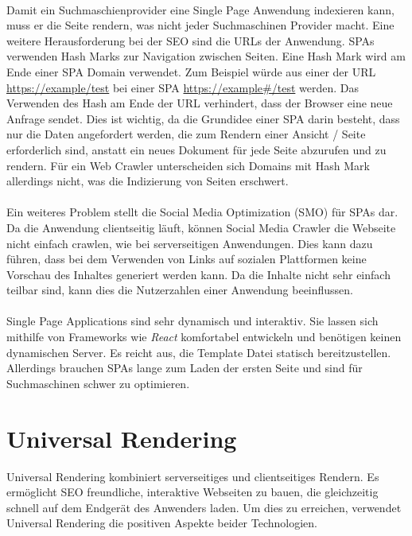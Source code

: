 \documentclass[runningheads]{llncs}
\numberwithin{figure}{section}
\begin{document}
\\
Damit ein Suchmaschienprovider eine Single Page Anwendung indexieren kann,
muss er die Seite rendern,
was nicht jeder Suchmaschinen Provider macht. 
Eine weitere Herausforderung bei der SEO sind die URLs der Anwendung. 
SPAs verwenden Hash Marks zur Navigation zwischen Seiten. 
Eine Hash Mark wird am Ende einer SPA Domain verwendet. 
Zum Beispiel würde aus einer der URL \url{https://example/test} bei einer SPA 
\url{https://example#/test} werden. 
Das Verwenden des Hash am Ende der URL verhindert, 
dass der Browser eine neue Anfrage sendet. 
Dies ist wichtig, da die Grundidee einer SPA darin besteht, 
dass nur die Daten angefordert werden, 
die zum Rendern einer Ansicht / Seite erforderlich sind, 
anstatt ein neues Dokument für jede Seite abzurufen und zu rendern. 
Für ein Web Crawler unterscheiden sich Domains mit Hash Mark allerdings 
nicht, was die Indizierung von Seiten erschwert. \cite{IsomorphicApps}
\\
\\
Ein weiteres Problem stellt die Social Media Optimization (SMO) für SPAs dar. 
Da die Anwendung clientseitig läuft, 
können Social Media Crawler die Webseite nicht einfach crawlen, 
wie bei serverseitigen Anwendungen. Dies kann dazu führen, 
dass bei dem Verwenden von Links auf sozialen Plattformen 
keine Vorschau des Inhaltes generiert werden kann. 
Da die Inhalte nicht sehr einfach teilbar sind, 
kann dies die Nutzerzahlen einer Anwendung beeinflussen.
\\
\\
Single Page Applications sind sehr dynamisch und interaktiv. 
Sie lassen sich mithilfe von Frameworks wie \textit{React} komfortabel entwickeln
und benötigen keinen dynamischen Server. Es reicht aus, 
die Template Datei statisch bereitzustellen. 
Allerdings brauchen SPAs lange zum Laden der ersten Seite
und sind für Suchmaschinen schwer zu optimieren. \cite{GoogleSearchAndJS}
\newpage

\section{Universal Rendering}
\label{sec:Universal Rendering}
Universal Rendering kombiniert serverseitiges und clientseitiges Rendern. 
Es ermöglicht SEO freundliche, interaktive Webseiten zu bauen, 
die gleichzeitig schnell auf dem Endgerät des Anwenders laden. 
Um dies zu erreichen, 
verwendet Universal Rendering die positiven Aspekte beider Technologien.
\end{document}
